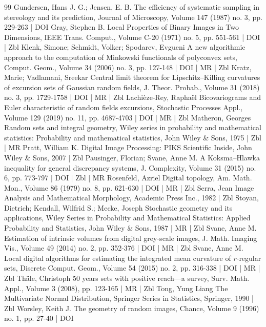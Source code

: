 \begin{thebibliography}{99}
Gundersen, Hans J. G.; Jensen, E. B. The efficiency of systematic sampling in stereology and its prediction, Journal of Microscopy, Volume 147 (1987) no. 3, pp. 229-263 | DOI
Gray, Stephen B. Local Properties of Binary Images in Two Dimensions, IEEE Trans. Comput., Volume C-20 (1971) no. 5, pp. 551-561 | DOI | Zbl
Klenk, Simone; Schmidt, Volker; Spodarev, Evgueni A new algorithmic approach to the computation of Minkowski functionals of polyconvex sets, Comput. Geom., Volume 34 (2006) no. 3, pp. 127-148 | DOI | MR | Zbl
Kratz, Marie; Vadlamani, Sreekar Central limit theorem for Lipschitz–Killing curvatures of excursion sets of Gaussian random fields, J. Theor. Probab., Volume 31 (2018) no. 3, pp. 1729-1758 | DOI | MR | Zbl
Lachièze-Rey, Raphaël Bicovariograms and Euler characteristic of random fields excursions, Stochastic Processes Appl., Volume 129 (2019) no. 11, pp. 4687-4703 | DOI | MR | Zbl
Matheron, Georges Random sets and integral geometry, Wiley series in probability and mathematical statistics: Probability and mathematical statistics, John Wiley \& Sons, 1975 | Zbl | MR
Pratt, William K. Digital Image Processing: PIKS Scientific Inside, John Wiley \& Sons, 2007 | Zbl
Pausinger, Florian; Svane, Anne M. A Koksma–Hlawka inequality for general discrepancy systems, J. Complexity, Volume 31 (2015) no. 6, pp. 773-797 | DOI | Zbl | MR
Rosenfeld, Azriel Digital topology, Am. Math. Mon., Volume 86 (1979) no. 8, pp. 621-630 | DOI | MR | Zbl
Serra, Jean Image Analysis and Mathematical Morphology, Academic Press Inc., 1982 | Zbl
Stoyan, Dietrich; Kendall, Wilfrid S.; Mecke, Joseph Stochastic geometry and its applications, Wiley Series in Probability and Mathematical Statistics: Applied Probability and Statistics, John Wiley \& Sons, 1987 | MR | Zbl
Svane, Anne M. Estimation of intrinsic volumes from digital grey-scale images, J. Math. Imaging Vis., Volume 49 (2014) no. 2, pp. 352-376 | DOI | MR | Zbl
Svane, Anne M. Local digital algorithms for estimating the integrated mean curvature of $r$-regular sets, Discrete Comput. Geom., Volume 54 (2015) no. 2, pp. 316-338 | DOI | MR | Zbl
Thäle, Christoph 50 years sets with positive reach—a survey, Surv. Math. Appl., Volume 3 (2008), pp. 123-165 | MR | Zbl
Tong, Yung Liang The Multivariate Normal Distribution, Springer Series in Statistics, Springer, 1990 | Zbl
Worsley, Keith J. The geometry of random images, Chance, Volume 9 (1996) no. 1, pp. 27-40 | DOI
\end{thebibliography}
